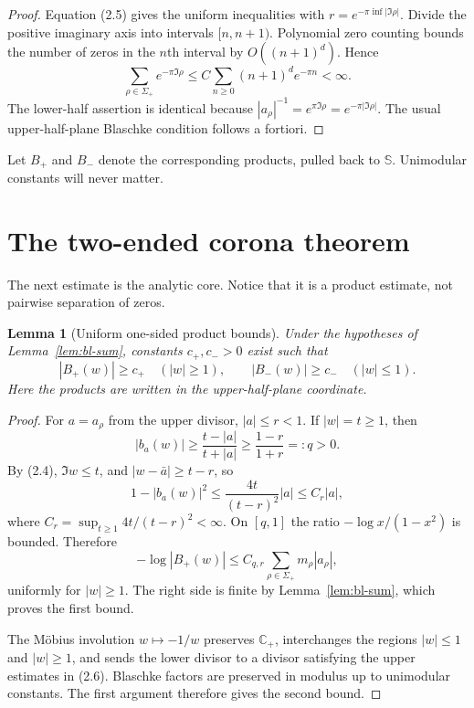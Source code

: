 \documentclass[11pt]{article}
\newtheorem{lemma}[theorem]{Lemma}
\theoremstyle{definition}
\theoremstyle{remark}
\newcommand{\C}{\mathbb C}
\begin{document}
\begin{proof}
Equation (2.5) gives the uniform inequalities with
$r=e^{-\pi\inf|\Im\rho|}$.  Divide the positive imaginary axis into intervals
$[n,n+1)$.  Polynomial zero counting bounds the number of zeros in the $n$th
interval by $O((n+1)^d)$.  Hence
\[
 \sum_{\rho\in\Sigma_+}e^{-\pi\Im\rho}
 \le C\sum_{n\ge0}(n+1)^d e^{-\pi n}<\infty.
\]
The lower-half assertion is identical because
$|a_\rho|^{-1}=e^{\pi\Im\rho}=e^{-\pi|\Im\rho|}$.
The usual upper-half-plane Blaschke condition follows a fortiori.
\end{proof}

Let $B_+$ and $B_-$ denote the corresponding products, pulled back to
$\mathbb S$.  Unimodular constants will never matter.

\section{The two-ended corona theorem}

The next estimate is the analytic core.  Notice that it is a product estimate,
not pairwise separation of zeros.

\begin{lemma}[Uniform one-sided product bounds]\label{lem:product-bound}
Under the hypotheses of Lemma~\ref{lem:bl-sum}, constants $c_+,c_->0$ exist
such that
\[
 |B_+(w)|\ge c_+\quad(|w|\ge1),\qquad
 |B_-(w)|\ge c_-\quad(|w|\le1).                       \tag{3.1}
\]
Here the products are written in the upper-half-plane coordinate.
\end{lemma}

\begin{proof}
For $a=a_\rho$ from the upper divisor, $|a|\le r<1$.  If $|w|=t\ge1$, then
\[
 |b_a(w)|\ge\frac{t-|a|}{t+|a|}\ge\frac{1-r}{1+r}=:q>0.  \tag{3.2}
\]
By (2.4), $\Im w\le t$, and $|w-\bar a|\ge t-r$, so
\[
       1-|b_a(w)|^2
       \le \frac{4t}{(t-r)^2}|a|
       \le C_r|a|,                                    \tag{3.3}
\]
where $C_r=\sup_{t\ge1}4t/(t-r)^2<\infty$.  On $[q,1]$ the ratio
$-\log x/(1-x^2)$ is bounded.  Therefore
\[
 -\log|B_+(w)|
 \le C_{q,r}\sum_{\rho\in\Sigma_+}m_\rho|a_\rho|,
\]
uniformly for $|w|\ge1$.  The right side is finite by Lemma~\ref{lem:bl-sum},
which proves the first bound.

The Möbius involution $w\mapsto-1/w$ preserves $\C_+$, interchanges the regions
$|w|\le1$ and $|w|\ge1$, and sends the lower divisor to a divisor satisfying the
upper estimates in (2.6).  Blaschke factors are preserved in modulus up to
unimodular constants.  The first argument therefore gives the second bound.
\end{proof}
\end{document}
